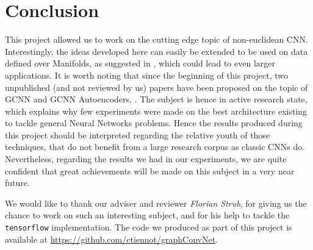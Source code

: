 \section{Conclusion}
This project allowed us to work on the cutting edge topic of non-euclidean CNN. Interestingly, the ideas developed here can easily be extended to be used on data defined over Manifolds, as suggested in \cite{DBLP:journals/corr/BronsteinBLSV16}, which could lead to even larger applications. It is worth noting that since the beginning of this project, two unpublished (and not reviewed by us) papers have been proposed on the topic of GCNN and GCNN Autoencoders,  \cite{2016arXiv161107308K} \cite{DBLP:journals/corr/KipfW16}. The subject is hence in active research state, which explains why few experiments were made on the best architecture existing to tackle general Neural Networks problems. Hence the results produced during this project should be interpreted regarding the relative youth of those techniques, that do not benefit from a large research corpus as classic CNNs do. Nevertheless, regarding the results we had in our experiments, we are quite confident that great achievements will be made on this subject in a very near future. 

We would like to thank our adviser and reviewer \emph{Florian Strub}, for giving us the chance to work on such an interesting subject, and for his help to tackle the \texttt{tensorflow} implementation. The code we produced as part of this project is available at \url{https://github.com/ctiennot/graphConvNet}.

